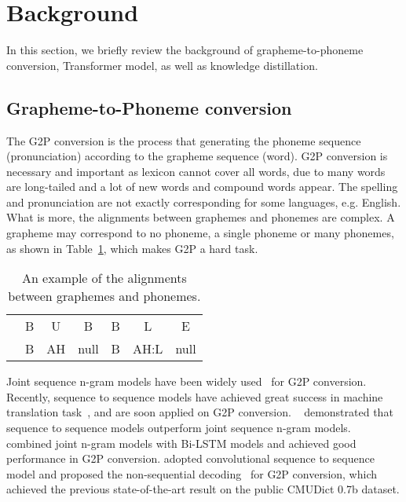 \documentclass[a4paper]{article}
\begin{document}
\section{Background}
In this section, we briefly review the background of grapheme-to-phoneme conversion, Transformer model, as well as knowledge distillation.

\subsection{Grapheme-to-Phoneme conversion}
The G2P conversion is the process that generating the phoneme sequence (pronunciation) according to the grapheme sequence (word). G2P conversion is necessary and important as lexicon cannot cover all words, due to many words are long-tailed and a lot of new words and compound words appear. The spelling and pronunciation are not exactly corresponding for some languages, e.g. English. What is more, the alignments between graphemes and phonemes are complex. A grapheme may correspond to no phoneme, a single phoneme or many phonemes, as shown in Table~\ref{tab:g2p}, which makes G2P a hard task.


\begin{table}[th]
  \caption{An example of the alignments between graphemes and phonemes.}
  \label{tab:g2p}
  \centering
  \begin{tabular}{ c|cccccc }
   \toprule
                           & B &U&B&B&L&E            \\
                           & B  & AH&null&B&AH:L&null              \\
   \bottomrule
  \end{tabular}
  
\end{table}

Joint sequence n-gram models have been widely used~\cite{bisani2008joint,chen2003conditional,wu2014encoding} for G2P conversion. Recently, sequence to sequence models have achieved great success in machine translation task~\cite{bahdanau2014neural,luong2015effective,wu2016google,hassan2018achieving}, and are soon applied on G2P conversion. ~\cite{yao2015sequence} demonstrated that sequence to sequence models outperform joint sequence n-gram models. ~\cite{toshniwal2016jointly,milde2017multitask} combined joint n-gram models with Bi-LSTM models and achieved good performance in G2P conversion. \cite{chae2018convolutional} adopted convolutional sequence to sequence model and proposed the non-sequential decoding~\cite{guo2018non} for G2P conversion, which achieved the previous state-of-the-art result on the public CMUDict 0.7b dataset.  
\end{document}
